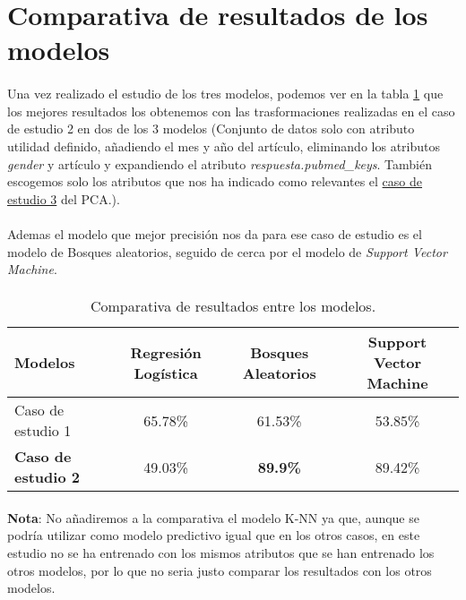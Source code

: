 \section{Comparativa de resultados de los modelos}
\label{resultados:compare}

\paragraph{}
Una vez realizado el estudio de los tres modelos, podemos ver en la tabla \ref{table:comparative} que los mejores resultados los obtenemos con las trasformaciones realizadas en el caso de estudio 2 en dos de los 3 modelos (Conjunto de datos solo con atributo utilidad definido, añadiendo el mes y año del artículo, eliminando los atributos \textit{gender} y artículo y expandiendo el atributo \textit{respuesta.pubmed\_keys}. También escogemos solo los atributos que nos ha indicado como relevantes el \hyperref[result:pca_case3]{caso de estudio 3} del PCA.).

\paragraph{}
Ademas el modelo que mejor precisión nos da para ese caso de estudio es el modelo de Bosques aleatorios, seguido de cerca por el modelo de \textit{Support Vector Machine}.

\paragraph{}
\begin{table}[!htb]
	\begin{tabular}{ | p{4cm} | c | c | c | }
		\hline Modelos & Regresión Logística & \textbf{Bosques Aleatorios} & Support Vector Machine \\ 
		\hline
		\hline
		Caso de estudio 1 & 65.78\% & 61.53\% & 53.85\% \\
		\textbf{Caso de estudio 2} & 49.03\% & \textbf{89.9\%} & 89.42\% \\ \hline
	\end{tabular}
		\caption{Comparativa de resultados entre los modelos.} \label{table:comparative}
\end{table}

\paragraph{}
\textbf{Nota}: No añadiremos a la comparativa el modelo K-NN ya que, aunque se podría utilizar como modelo predictivo igual que en los otros casos, en este estudio no se ha entrenado con los mismos atributos que se han entrenado los otros modelos, por lo que no seria justo comparar los resultados con los otros modelos.